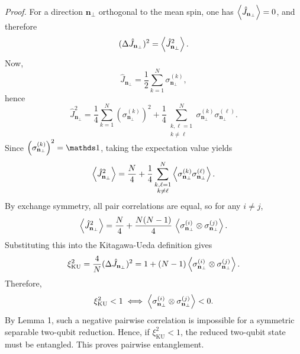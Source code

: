 \noindent\textit{Proof.}  
For a direction \(\mathbf{n}_\perp\) orthogonal to the mean spin, one has \(\expval{\hat J_{\mathbf{n}_\perp}}=0\), and therefore
\begin{equation}
	(\Delta \hat J_{\mathbf{n}_\perp})^2
	=
	\expval{\hat J_{\mathbf{n}_\perp}^2}.
	\label{eq:intro_qm_variance_transverse_equals_second_moment}
\end{equation}
Now,
\begin{equation}
	\hat J_{\mathbf{n}_\perp}
	=
	\frac{1}{2}\sum_{k=1}^{N}\sigma_{\mathbf{n}_\perp}^{(k)},
	\label{eq:intro_qm_collective_transverse_operator}
\end{equation}
hence
\begin{equation}
	\hat J_{\mathbf{n}_\perp}^2
	=
	\frac{1}{4}\sum_{k=1}^{N}\left(\sigma_{\mathbf{n}_\perp}^{(k)}\right)^2
	+
	\frac{1}{4}\sum_{\substack{k,\ell=1\\k\neq \ell}}^{N}
	\sigma_{\mathbf{n}_\perp}^{(k)}\sigma_{\mathbf{n}_\perp}^{(\ell)}.
	\label{eq:intro_qm_collective_transverse_squared}
\end{equation}
Since \(\left(\sigma_{\mathbf{n}_\perp}^{(k)}\right)^2=\id\), taking the expectation value yields
\begin{equation}
	\expval{\hat J_{\mathbf{n}_\perp}^2}
	=
	\frac{N}{4}
	+
	\frac{1}{4}\sum_{\substack{k,\ell=1\\k\neq \ell}}^{N}
	\expval{\sigma_{\mathbf{n}_\perp}^{(k)}\sigma_{\mathbf{n}_\perp}^{(\ell)}}.
	\label{eq:intro_qm_collective_transverse_second_moment_expanded}
\end{equation}
By exchange symmetry, all pair correlations are equal, so for any \(i\neq j\),
\begin{equation}
	\expval{\hat J_{\mathbf{n}_\perp}^2}
	=
	\frac{N}{4}
	+
	\frac{N(N-1)}{4}\,
	\expval{\sigma_{\mathbf{n}_\perp}^{(i)}\otimes \sigma_{\mathbf{n}_\perp}^{(j)}}.
	\label{eq:intro_qm_collective_transverse_second_moment_symmetric}
\end{equation}
Substituting this into the Kitagawa-Ueda definition gives
\begin{equation}
	\xi_{\mathrm{KU}}^2
	=
	\frac{4}{N}(\Delta \hat J_{\mathbf{n}_\perp})^2
	=
	1+(N-1)\expval{\sigma_{\mathbf{n}_\perp}^{(i)}\otimes \sigma_{\mathbf{n}_\perp}^{(j)}}.
	\label{eq:intro_qm_ku_negative_pairwise_relation}
\end{equation}
Therefore,
\begin{equation}
	\xi_{\mathrm{KU}}^2<1
	\iff
	\expval{\sigma_{\mathbf{n}_\perp}^{(i)}\otimes \sigma_{\mathbf{n}_\perp}^{(j)}}<0.
	\label{eq:intro_qm_spin_squeezing_negative_correlation_equivalence}
\end{equation}
By Lemma 1, such a negative pairwise correlation is impossible for a symmetric separable two-qubit reduction. Hence, if \(\xi_{\mathrm{KU}}^2<1\), the reduced two-qubit state must be entangled. This proves pairwise entanglement.

